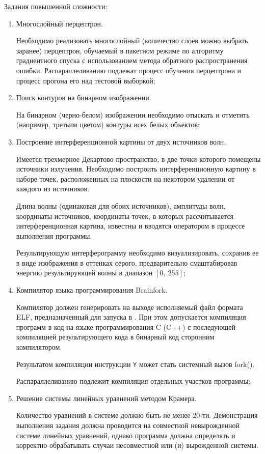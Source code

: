 Задания повышенной сложности:

\begin{enumerate}

	\item Многослойный перцептрон.

		Необходимо реализовать многослойный (количество слоев можно выбрать заранее) перцептрон, обучаемый в пакетном режиме по алгоритму градиентного спуска с использованием метода обратного распространения ошибки. Распараллеливанию подлежат процесс обучения перцептрона и процесс прогона его над тестовой выборкой;

	\item Поиск контуров на бинарном изображении.

		На бинарном (черно-белом) изображении необходимо отыскать и отметить (например, третьим цветом) контуры всех белых объектов;
	
	\item Построение интерференционной картины от двух источников волн.

		Имеется трехмерное Декартово пространство, в две точки которого помещены источники излучения. Необходимо построить интерференционную картину в наборе точек, расположенных на плоскости на некотором удалении от каждого из источников.
		
		Длина волны (одинаковая для обоих источников), амплитуды волн, координаты источников, координаты точек, в которых рассчитывается интерференционная картина, известны и вводятся оператором в процессе выполнения программы.

		Результирующую интерферограмму необходимо визуализировать, сохранив ее в виде изображения в оттенках серого, предварительно смаштабировав энергию результирующей волны в диапазон $[0,~255]$;
	
	\item Компилятор языка программирования Brainfork.

		Компилятор должен генерировать на выходе исполняемый файл формата ELF, предназначенный для запуска в \gl. При этом допускается компиляция программ в код на языке программирования C (C++) с последующей компиляцией результирующего кода в бинарный код сторонним компилятором.
		
		Результатом компиляции инструкции \verb|Y| может стать системный вызов fork().

		Распараллеливанию подлежит компиляция отдельных участков программы;
	
	\item Решение системы линейных уравнений методом Крамера.

		Количество уравнений в системе должно быть не менее 20-ти. Демонстрация выполнения задания должна проводится на совместной невырожденной системе линейных уравнений, однако программа должна определять и корректно обрабатывать случаи несовместной или (и) вырожденной системы.

\end{enumerate}

